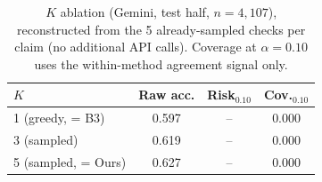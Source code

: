 \begin{table}[t]
\centering
\caption{$K$ ablation (Gemini, test half, $n=4{,}107$), reconstructed from
the 5 already-sampled checks per claim (no additional API calls). Coverage
at $\alpha=0.10$ uses the within-method agreement signal only.}
\label{tab:ablations}
\footnotesize
\begin{tabular}{lccc}
\toprule
$K$ & Raw acc. & Risk$_{0.10}$ & Cov.$_{0.10}$ \\
\midrule
1 (greedy, = B3) & 0.597 & -- & 0.000 \\
3 (sampled) & 0.619 & -- & 0.000 \\
5 (sampled, = Ours) & 0.627 & -- & 0.000 \\
\bottomrule
\end{tabular}
\end{table}
